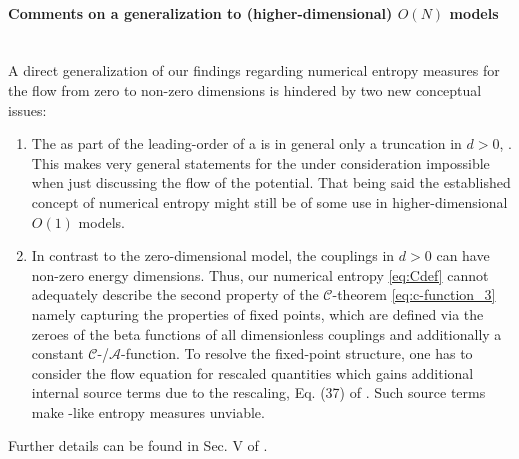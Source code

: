 \paragraph{Comments on a generalization to (higher-dimensional) \texorpdfstring{$O(N)$}{O(N)} models}\label{paragraph:cTheoremON}\mbox{}\\
A direct generalization of our findings regarding numerical entropy measures for the \frg{} flow from zero to non-zero dimensions is hindered by two new conceptual issues:
\begin{enumerate}
	\item The \lpa{} as part of the leading-order of a \de{} is in general only a truncation in $d>0$, \cf{} \deRef{}.
	This makes very general statements for the \qft{} under consideration \apriori{} impossible when just discussing the \frg{} flow of the potential.
	That being said the established concept of numerical entropy might still be of some use in higher-dimensional $O(1)$ models.
	\item	In contrast to the zero-dimensional model, the couplings in $d>0$ can have non-zero energy dimensions.
	Thus, our numerical entropy \eqref{eq:Cdef} cannot adequately describe the second property of the $\mathcal{C}$-theorem \eqref{eq:c-function_3} \dash{} namely capturing the properties of fixed points, which are defined via the zeroes of the beta functions of all dimensionless couplings and additionally a constant $\mathcal{C}$-/$\mathcal{A}$-function.
	To resolve the fixed-point structure, one has to consider the flow equation for rescaled quantities which gains additional internal source terms due to the rescaling, \cf{} Eq. (37) of .
	Such source terms make \tv-like entropy measures unviable.
\end{enumerate}
Further details can be found in Sec. V of .\clearpage